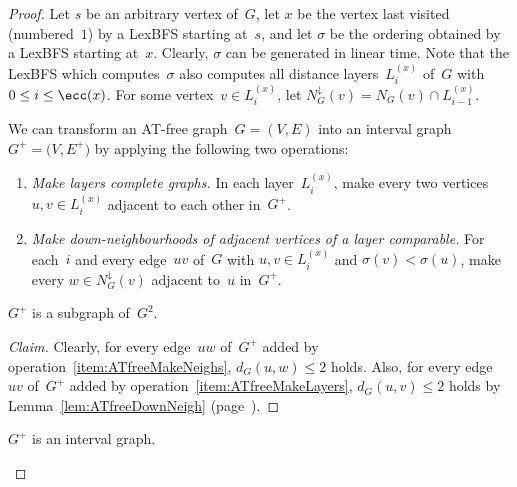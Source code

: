 \begin{proof}
Let $s$ be an arbitrary vertex of~$G$, let $x$ be the vertex last visited (numbered~$1$) by a LexBFS starting at~$s$, and let $\sigma$ be the ordering obtained by a LexBFS starting at~$x$.
Clearly, $\sigma$ can be generated in linear time.
Note that the LexBFS which computes~$\sigma$ also computes all distance layers~$L_i^{(x)}$ of~$G$ with $0 \leq i \leq \ecc(x)$.
For some vertex~$v \in L_i^{(x)}$, let $N_G^\downarrow(v) = N_G(v) \cap L_{i-1}^{(x)}$.

We can transform an AT-free graph~$G = (V, E)$ into an interval graph~$G^+ = \big( V, E^+ \big)$ by applying the following two operations:

\begin{enumerate}[(1)]
    \item
        \label{item:ATfreeMakeLayers}
        \emph{Make layers complete graphs.}
        In each layer~$L_i^{(x)}$, make every two vertices~$u, v \in L_i^{(x)}$ adjacent to each other in~$G^+$.
    \item
        \label{item:ATfreeMakeNeighs}
        \emph{Make down-neighbourhoods of adjacent vertices of a layer comparable.}
        For each~$i$ and every edge~$uv$ of~$G$ with $u, v \in L_i^{(x)}$ and $\sigma(v) < \sigma(u)$, make every $w \in N_G^{\downarrow}(v)$ adjacent to~$u$ in~$G^+$.
\end{enumerate}

\begin{claim}
    \label{cla:GplusGsquare}
\( G^+ \) is a subgraph of~\( G^2 \).
\end{claim}

\begin{proof}[Claim]
Clearly, for every edge~$uw$ of~$G^+$ added by operation~\ref{item:ATfreeMakeNeighs}, $d_G(u, w) \leq 2$ holds.
Also, for every edge~$uv$ of~$G^+$ added by operation~\ref{item:ATfreeMakeLayers}, $d_G(u, v) \leq 2$ holds by Lemma~\ref{lem:ATfreeDownNeigh} (page~\pageref{lem:ATfreeDownNeigh}).
\end{proof}

\begin{claim}
    \label{cla:GplusInterval}
\( G^+ \) is an interval graph.
\end{claim}


\end{proof}
